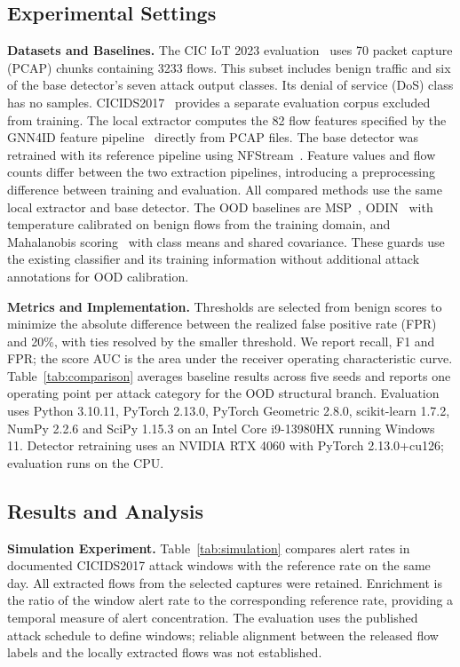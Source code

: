 \documentclass{article}
\begin{document}
\subsection{Experimental Settings}
\label{ssec:settings}

\textbf{Datasets and Baselines.} The CIC IoT 2023 evaluation~\cite{neto2023ciciot}
uses 70 packet capture (PCAP) chunks containing 3233 flows. This subset includes
benign traffic and six of the base detector's seven attack output classes. Its
denial of service (DoS) class has no samples. CICIDS2017~\cite{sharafaldin2018cicids} provides a separate
evaluation corpus excluded from training. The local extractor computes the 82 flow
features specified by the GNN4ID feature pipeline~\cite{farrukh2023xgnid} directly from PCAP files. The base
detector was retrained with its reference pipeline using
NFStream~\cite{aouini2021nfstream}. Feature values and flow counts differ between
the two extraction pipelines, introducing a preprocessing difference between
training and evaluation. All compared methods use the same local extractor and
base detector. The OOD baselines are MSP~\cite{hendrycks2017msp},
ODIN~\cite{liang2018odin} with temperature calibrated on benign flows from the
training domain, and Mahalanobis scoring~\cite{lee2018mahalanobis} with class means
and shared covariance. These guards use the existing classifier and its training
information without additional attack annotations for OOD calibration.

\textbf{Metrics and Implementation.} Thresholds are selected from benign scores to
minimize the absolute difference between the realized false positive rate (FPR)
and 20\%, with ties resolved by the smaller threshold. We report recall, F1 and
FPR; the score AUC is the area under the receiver operating characteristic curve.
Table~\ref{tab:comparison} averages baseline results across five seeds and reports
one operating point per attack category for the OOD structural branch. Evaluation uses Python
3.10.11, PyTorch 2.13.0, PyTorch Geometric 2.8.0, scikit-learn 1.7.2, NumPy 2.2.6
and SciPy 1.15.3 on an Intel Core i9-13980HX running Windows 11. Detector retraining
uses an NVIDIA RTX 4060 with PyTorch 2.13.0+cu126; evaluation runs on the CPU.

\subsection{Results and Analysis}
\label{ssec:results}

\textbf{Simulation Experiment.} Table~\ref{tab:simulation} compares alert rates
in documented CICIDS2017 attack windows with the reference rate on the same day.
All extracted flows from the selected captures were retained. Enrichment is the ratio of the window alert
rate to the corresponding reference rate, providing a temporal measure of alert
concentration. The evaluation uses the published attack schedule to define windows;
reliable alignment between the released flow labels and the locally extracted
flows was not established.
\end{document}
